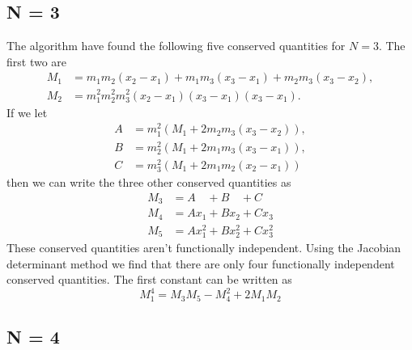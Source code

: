 \documentclass[english,master]{liumaiex}
\theoremstyle{plain}
\theoremstyle{definition}
\begin{document}
\subsection*{N = 3}

The algorithm have found the following five conserved quantities for $N = 3$.  The first two are
\begin{align}
	M_1 &= m_1m_2(x_2 - x_1) + m_1m_3(x_3 - x_1) + m_2m_3(x_3 - x_2), \\
	M_2 &= m_1^2m_2^2m_3^2(x_2 - x_1)(x_3 - x_1)(x_3 - x_1).
\end{align}
If we let
\begin{align}
	A & = m_1^2(M_1 + 2m_2m_3(x_3-x_2)), \\
	B & = m_2^2(M_1 + 2m_1m_3(x_3-x_1)), \\
	C & = m_3^2(M_1 + 2m_1m_2(x_2-x_1))
\end{align}
then we can write the three other conserved quantities as
\begin{align}
	M_3 &= A\phantom{x_1} + B\phantom{x_2} + C\phantom{x_3} \\
	M_4 &= Ax_1 + Bx_2 + Cx_3 \\
	M_5 &= Ax_1^2 + Bx_2^2 + Cx_3^2
\end{align}
These conserved quantities aren't functionally independent. Using the Jacobian determinant method we find that there are only four functionally independent conserved quantities. The first constant can be written as
\begin{equation}
	M_1^4 = M_3M_5 - M_4^2 + 2M_1M_2
\end{equation}

\subsection*{N = 4}
\end{document}

